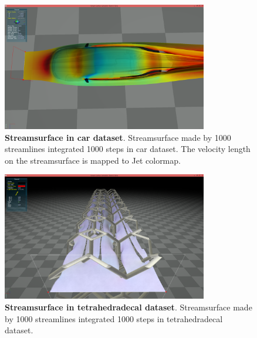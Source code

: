 \documentclass[]{article}
\begin{document}
\begin{figure}[!ht]
	\centering
	\includegraphics[width=0.80\textwidth]{car.png}
	\caption[Streamsurface in car dataset]{\textbf{Streamsurface in car dataset}. Streamsurface made by 1000 streamlines integrated 1000 steps in car dataset. The velocity length on the streamsurface is mapped to Jet colormap.}
	\label{fig:car_result}
\end{figure}


\begin{figure}[!ht]
	\centering
	\includegraphics[width=0.80\textwidth]{tetra.png}
	\caption[Streamsurface in tetrahedradecal dataset]{\textbf{Streamsurface in tetrahedradecal dataset}. Streamsurface made by 1000 streamlines integrated 1000 steps in tetrahedradecal dataset.  }
	\label{fig:tetra_result}
\end{figure}
\end{document}
